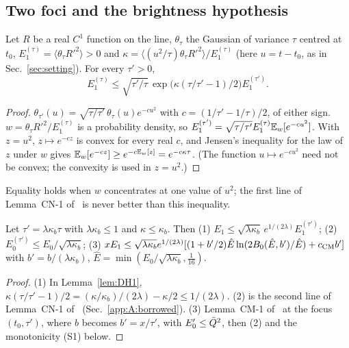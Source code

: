 \subsection{Two foci and the brightness hypothesis}
\label{app:A:J}

\begin{lemma} \proofst
\label{lem:DH1}
Let $R$ be a real $C^1$ function on the line, $\theta_\tau$ the Gaussian of variance $\tau$ centred at $t_0$, $E_1^{(\tau)}=\langle\theta_\tau R'^2\rangle>0$ and $\kappa=\langle(u^2/\tau)\theta_\tau R'^2\rangle/E_1^{(\tau)}$ (here $u=t-t_0$, as in Sec.~\ref{sec:setting}). For every $\tau'>0$,
\begin{equation}
E_1^{(\tau)}\le\sqrt{\tau'/\tau}\,\exp\bigl(\kappa(\tau/\tau'-1)/2\bigr)E_1^{(\tau')} .
\end{equation}
\end{lemma}
\begin{proof}
$\theta_{\tau'}(u)=\sqrt{\tau/\tau'}\,\theta_\tau(u)e^{-cu^2}$ with $c=(1/\tau'-1/\tau)/2$, of either sign. $w=\theta_\tau R'^2/E_1^{(\tau)}$ is a probability density, so $E_1^{(\tau')}=\sqrt{\tau/\tau'}E_1^{(\tau)}\mathbb{E}_w[e^{-cu^2}]$.
With $z=u^2$, $z\mapsto e^{-cz}$ is convex for every real $c$, and Jensen's inequality for the law of $z$ under $w$ gives $\mathbb{E}_w[e^{-cz}]\ge e^{-c\mathbb{E}_w[z]}=e^{-c\kappa\tau}$.
(The function $u\mapsto e^{-cu^2}$ need not be convex; the convexity is used in $z=u^2$.)
\end{proof}
Equality holds when $w$ concentrates at one value of $u^2$; the first line of Lemma~CN-1 of~\cite{H} is never better than this inequality.

\begin{corollary}[(J)] \proofst
\label{cor:J}
Let $\tau'=\lambda\kappa_b\tau$ with $\lambda\kappa_b\le1$ and $\kappa\le\kappa_b$. Then
(1) $E_1\le\sqrt{\lambda\kappa_b}\,e^{1/(2\lambda)}E_1^{(\tau')}$;
(2) $E_0^{(\tau')}\le E_0/\sqrt{\lambda\kappa_b}$;
(3) $xE_1\le\sqrt{\lambda\kappa_b}e^{1/(2\lambda)}[(1+b'/2)\hat E\ln(2B_0(\hat E,b')/\hat E)+c_{\rm CM}b']$ with $b'=b/(\lambda\kappa_b)$, $\hat E=\min(E_0/\sqrt{\lambda\kappa_b},\frac1{16})$.
\end{corollary}
\begin{proof}
(1) In Lemma~\ref{lem:DH1}, $\kappa(\tau/\tau'-1)/2=(\kappa/\kappa_b)/(2\lambda)-\kappa/2\le1/(2\lambda)$.
(2) is the second line of Lemma~CN-1 of~\cite{H} (Sec.~\ref{app:A:borrowed}).
(3) Lemma~CM-1 of~\cite{H} at the focus $(t_0,\tau')$, where $b$ becomes $b'=x/\tau'$, with $E_0'\le\bar Q^2$, then (2) and the monotonicity (S1) below.
\end{proof}

